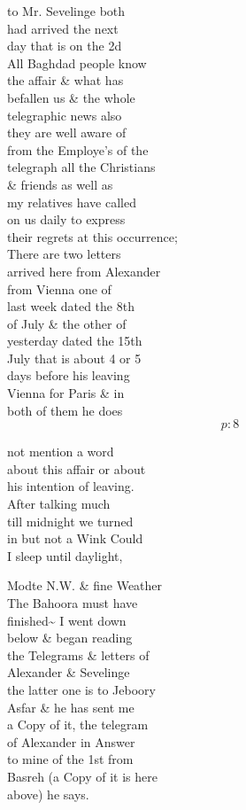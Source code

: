 \documentclass{report}
\begin{document}
	\par{
 	to Mr. Sevelinge both\ \\had arrived the next\ \\day that is on the 2d\ \\All Baghdad people know\ \\the affair \& what has\ \\befallen us \& the whole\ \\telegraphic news also\ \\they are well aware of\ \\from the Employe's of the\ \\telegraph all the Christians\ \\\& friends as well as\ \\my relatives have called\ \\on us daily to express\ \\their regrets at this occurrence;\ \\There are two letters\ \\arrived here from Alexander\ \\from Vienna one of\ \\last week dated the 8th\ \\of July \& the other of\ \\yesterday dated the 15th\ \\July that is about 4 or 5\ \\days before his leaving\ \\Vienna for Paris \& in\ \\both of them he does\ \\
  \[p: 8 \]

	}

	\par{
 	not mention a word\ \\about this affair or about\ \\his intention of leaving.\ \\After talking much\ \\till midnight we turned\ \\in but not a Wink Could\ \\I sleep until daylight,\ \\
	}

	\par{
 	Modte N.W. \& fine Weather\ \\The Bahoora must have\ \\finished\~{} I went down\ \\below \& began reading\ \\the Telegrams \& letters of\ \\Alexander \& Sevelinge\ \\the latter one is to Jeboory\ \\Asfar \& he has sent me\ \\a Copy of it, the telegram\ \\of Alexander in Answer\ \\to mine of the 1st from\ \\Basreh (a Copy of it is here\ \\above) he says.\ \\
	}
\end{document}
